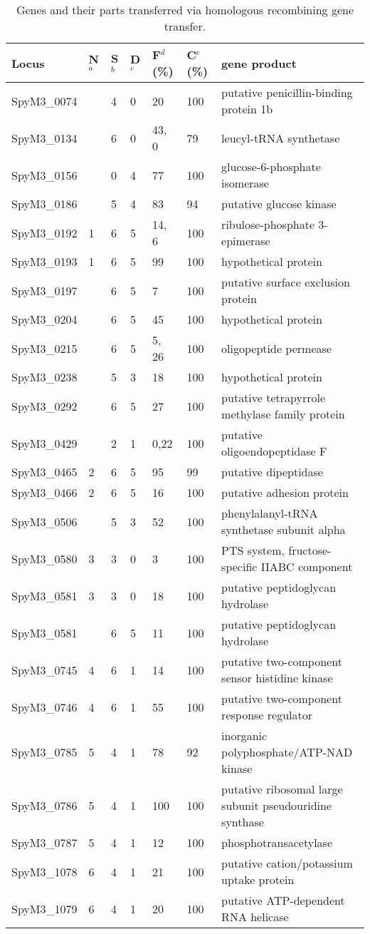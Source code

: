 \documentclass[english]{article}
\providecommand{\tabularnewline}{\\}
\begin{document}
\begin{table}
\caption{\label{tab:genes-transfer}Genes and their parts transferred via 
homologous
recombining gene transfer. }
{\footnotesize
\begin{tabular}{|lllllll|}
\hline 
Locus  & N$^a$  & S$^b$  & D$^c$ & F$^d$(\%)  & C$^e$(\%)  & gene 
product\tabularnewline
\hline 
SpyM3\_0074  &  & 4  & 0  & 20  & 100  & putative penicillin-binding protein 1b 
\tabularnewline
SpyM3\_0134  &  & 6  & 0  & 43, 0 & 79  & leucyl-tRNA synthetase \tabularnewline
SpyM3\_0156  &  & 0  & 4  & 77  & 100  & glucose-6-phosphate isomerase 
\tabularnewline
SpyM3\_0186  &  & 5  & 4  & 83  & 94  & putative glucose kinase \tabularnewline
SpyM3\_0192  & 1 & 6  & 5  & 14, 6 & 100  & ribulose-phosphate 3-epimerase 
\tabularnewline
SpyM3\_0193  & 1 & 6  & 5  & 99  & 100  & hypothetical protein\tabularnewline
SpyM3\_0197  &  & 6  & 5  & 7  & 100  & putative surface exclusion 
protein\tabularnewline
SpyM3\_0204  &  & 6  & 5  & 45  & 100  & hypothetical protein \tabularnewline
SpyM3\_0215  &  & 6  & 5  & 5, 26 & 100  & oligopeptide permease \tabularnewline
SpyM3\_0238  &  & 5  & 3  & 18  & 100  & hypothetical protein \tabularnewline
SpyM3\_0292  &  & 6  & 5  & 27  & 100  & putative tetrapyrrole methylase family 
protein \tabularnewline
SpyM3\_0429  &  & 2  & 1  & 0,22  & 100  & putative oligoendopeptidase 
F\tabularnewline
SpyM3\_0465  & 2 & 6  & 5  & 95  & 99  & putative dipeptidase \tabularnewline
SpyM3\_0466  & 2 & 6  & 5  & 16  & 100  & putative adhesion protein 
\tabularnewline
SpyM3\_0506  &  & 5  & 3  & 52  & 100  & phenylalanyl-tRNA synthetase subunit 
alpha \tabularnewline
SpyM3\_0580  & 3 & 3  & 0  & 3  & 100  & PTS system, fructose-specific IIABC 
component\tabularnewline
SpyM3\_0581  & 3 & 3  & 0  & 18  & 100  & putative peptidoglycan hydrolase 
\tabularnewline
SpyM3\_0581  &  & 6  & 5  & 11  & 100  & putative peptidoglycan hydrolase 
\tabularnewline
SpyM3\_0745  & 4 & 6  & 1  & 14  & 100  & putative two-component sensor 
histidine kinase \tabularnewline
SpyM3\_0746  & 4 & 6  & 1  & 55  & 100  & putative two-component response 
regulator \tabularnewline
SpyM3\_0785  & 5 & 4  & 1  & 78  & 92  & inorganic polyphosphate/ATP-NAD 
kinase\tabularnewline
SpyM3\_0786  & 5 & 4  & 1  & 100  & 100  & putative ribosomal large subunit 
pseudouridine synthase \tabularnewline
SpyM3\_0787  & 5 & 4  & 1  & 12  & 100  & phosphotransacetylase \tabularnewline
SpyM3\_1078  & 6 & 4  & 1  & 21  & 100  & putative cation/potassium uptake 
protein \tabularnewline
SpyM3\_1079  & 6 & 4  & 1  & 20  & 100  & putative ATP-dependent RNA helicase 

\end{tabular}}
\end{table}
\end{document}
